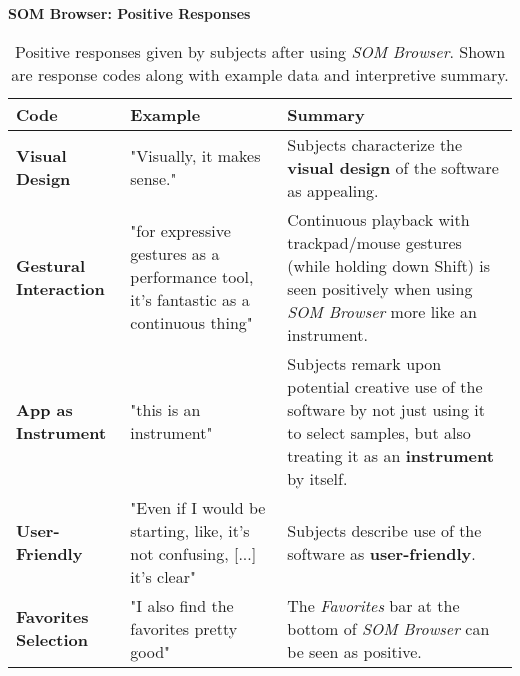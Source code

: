 \begin{table}[!htb]
  \renewcommand{\arraystretch}{1.2}
  \centering
  \textbf{SOM Browser: Positive Responses} \\ [3mm]
  \footnotesize
  \colorbox{light-bg}{
  \begin{tabular}{ p{4.0cm} p{4.75cm} p{4.75cm} }
  \hline
    \textbf{Code} & \textbf{Example} & \textbf{Summary} \\
    \hline
    \textbf{Visual Design}
    &
    "Visually, it makes sense."
    &
    Subjects characterize the \textbf{visual design} of the software as
    appealing.
    \\
    \textbf{Gestural Interaction}
    &
    "for expressive gestures as a performance tool, it’s fantastic as a
    continuous thing"
    &
    Continuous playback with trackpad/mouse gestures (while holding down Shift)
    is seen positively when using \textit{SOM Browser} more like an instrument.
    \\
    \textbf{App as Instrument}
    &
    "this is an instrument"
    &
    Subjects remark upon potential creative use of the software by not just
    using it to select samples, but also treating it as an \textbf{instrument}
    by itself.
    \\
    \textbf{User-Friendly}
    &
    "Even if I would be starting, like, it's not confusing, [...] it’s clear"
    &
    Subjects describe use of the software as \textbf{user-friendly}.
    \\
    \textbf{Favorites Selection}
    &
    "I also find the favorites pretty good"
    &
    The \textit{Favorites} bar at the bottom of \textit{SOM Browser} can be seen
    as positive.
    \\
  \end{tabular}}
  \caption[\textit{SOM Browser}: Positive Responses]{Positive responses given
  by subjects after using \textit{SOM Browser}. Shown are response codes along
  with example data and interpretive summary.}
  \label{table:responses_som-browser_positive}
\end{table}


